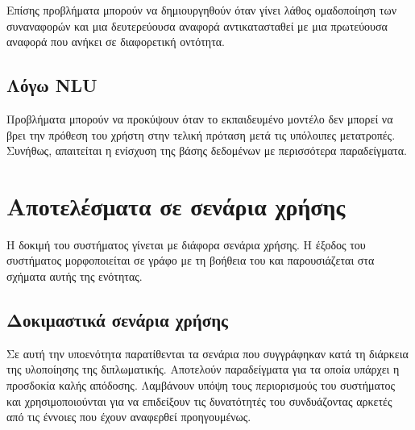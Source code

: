 Επίσης προβλήματα μπορούν να δημιουργηθούν όταν γίνει λάθος ομαδοποίηση των συναναφορών και μια δευτερεύουσα αναφορά αντικατασταθεί με μια πρωτεύουσα αναφορά που ανήκει σε διαφορετική οντότητα.

\subsection{Λόγω NLU}
Προβλήματα μπορούν να προκύψουν όταν το εκπαιδευμένο μοντέλο \NLU{} δεν μπορεί να βρει την πρόθεση του χρήστη στην τελική πρόταση μετά τις υπόλοιπες μετατροπές.
Συνήθως, απαιτείται η ενίσχυση της βάσης δεδομένων με περισσότερα παραδείγματα.

\section{Αποτελέσματα σε σενάρια χρήσης}
Η δοκιμή του συστήματος γίνεται με διάφορα σενάρια χρήσης.
Η έξοδος του συστήματος μορφοποιείται σε γράφο με τη βοήθεια του  και παρουσιάζεται στα σχήματα αυτής της ενότητας.

\subsection{Δοκιμαστικά σενάρια χρήσης}
Σε αυτή την υποενότητα παρατίθενται τα σενάρια που συγγράφηκαν κατά τη διάρκεια της υλοποίησης της διπλωματικής.
Αποτελούν παραδείγματα για τα οποία υπάρχει η προσδοκία καλής απόδοσης.
Λαμβάνουν υπόψη τους περιορισμούς του συστήματος και χρησιμοποιούνται για να επιδείξουν τις δυνατότητές του συνδυάζοντας αρκετές από τις έννοιες που έχουν αναφερθεί προηγουμένως.

